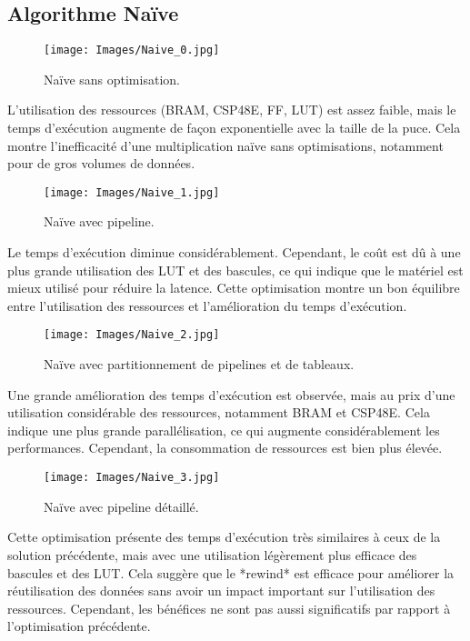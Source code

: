 \documentclass[../CSC_5RO06_TA.tex]{subfiles}
\begin{document}
\subsection{Algorithme Naïve}

\begin{figure}[H]
    \centering
    \texttt{[image: Images/Naive\_0.jpg]}
    \caption{Naïve sans optimisation.}
    \label{fig:1}
\end{figure}

L'utilisation des ressources (BRAM, CSP48E, FF, LUT) est assez faible, mais le temps d'exécution augmente de façon exponentielle avec la taille de la puce. Cela montre l’inefficacité d’une multiplication naïve sans optimisations, notamment pour de gros volumes de données.


\begin{figure}[H]
    \centering
    \texttt{[image: Images/Naive\_1.jpg]}
    \caption{Naïve avec pipeline.}
    \label{fig:2}
\end{figure}

Le temps d'exécution diminue considérablement. Cependant, le coût est dû à une plus grande utilisation des LUT et des bascules, ce qui indique que le matériel est mieux utilisé pour réduire la latence. Cette optimisation montre un bon équilibre entre l'utilisation des ressources et l'amélioration du temps d'exécution.

\begin{figure}[H]
    \centering
    \texttt{[image: Images/Naive\_2.jpg]}
    \caption{Naïve avec partitionnement de pipelines et de tableaux.}
    \label{fig:3}
\end{figure}

Une grande amélioration des temps d’exécution est observée, mais au prix d’une utilisation considérable des ressources, notamment BRAM et CSP48E. Cela indique une plus grande parallélisation, ce qui augmente considérablement les performances. Cependant, la consommation de ressources est bien plus élevée.

\begin{figure}[H]
    \centering
    \texttt{[image: Images/Naive\_3.jpg]}
    \caption{Naïve avec pipeline détaillé.}
    \label{fig:4}
\end{figure}

Cette optimisation présente des temps d'exécution très similaires à ceux de la solution précédente, mais avec une utilisation légèrement plus efficace des bascules et des LUT. Cela suggère que le *rewind* est efficace pour améliorer la réutilisation des données sans avoir un impact important sur l'utilisation des ressources. Cependant, les bénéfices ne sont pas aussi significatifs par rapport à l’optimisation précédente.
\end{document}
